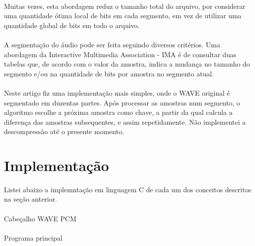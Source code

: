 \documentclass[a4paper,12pt]{article}
\begin{document}
\paragraph{}
Muitas vezes, esta abordagem reduz o tamanho total do arquivo, por considerar uma quantidade ótima local de bits em cada segmento, em vez de utilizar uma quantidade global de bits em todo o arquivo.

\paragraph{}
A segmentação do áudio pode ser feita seguindo diversos critérios. Uma abordagem da Interactive Multimedia Association - IMA é de consultar duas tabelas que, de acordo com o valor da amostra, indica a mudança no tamanho do segmento e/ou na quantidade de bits por amostra no segmento atual\cite{Pan-1993}.

\paragraph{}
Neste artigo fiz uma implementação mais simples, onde o WAVE original é segmentado em duzentas partes. Após processar as amostras num segmento, o algoritmo escolhe a próxima amostra como chave, a partir da qual calcula a diferença das amostras subsequentes, e assim repetidamente.
Não implementei a descompressão até o presente momento.

\section{Implementação}

\paragraph{}
Listei abaixo a implemntação em linguagem C de cada um dos conceitos descritos na seção anterior.

\paragraph{}
Cabeçalho WAVE PCM


\paragraph{}
Programa principal

\end{document}
